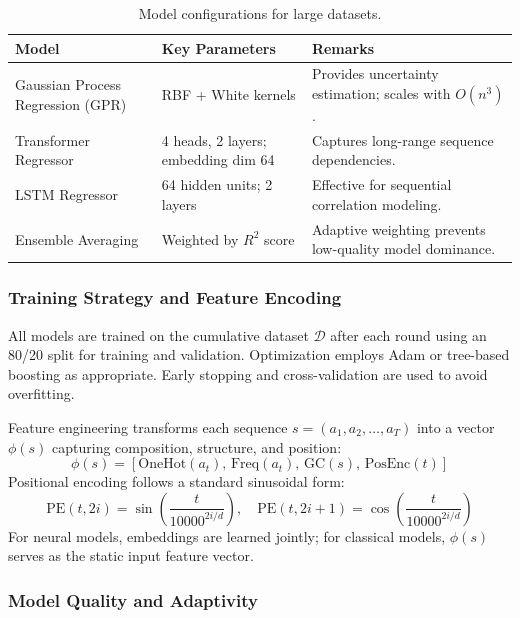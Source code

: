 \documentclass[conference]{IEEEtran}
\begin{document}
\begin{table}[!t]
\centering
\caption{Model configurations for large datasets.}
\label{tab:large_models}
\small %
\setlength{\tabcolsep}{3pt} %
\begin{tabularx}{\columnwidth}{@{} p{2.3cm} p{2.8cm} >{\RaggedRight}X @{}}
\toprule
\textbf{Model} & \textbf{Key Parameters} & \textbf{Remarks} \\
\midrule
Gaussian Process Regression (GPR) & RBF + White kernels & Provides uncertainty estimation; scales with $O(n^3)$. \\
Transformer Regressor & 4 heads, 2 layers; embedding dim 64 & Captures long-range sequence dependencies. \\
LSTM Regressor & 64 hidden units; 2 layers & Effective for sequential correlation modeling. \\
Ensemble Averaging & Weighted by $R^2$ score & Adaptive weighting prevents low-quality model dominance. \\
\bottomrule
\end{tabularx}
\end{table}

\subsubsection{Training Strategy and Feature Encoding}

All models are trained on the cumulative dataset $\mathcal{D}$ after each round using an 80/20 split for training and validation. Optimization employs Adam or tree-based boosting as appropriate. Early stopping and cross-validation are used to avoid overfitting.

Feature engineering transforms each sequence $s = (a_1, a_2, \ldots, a_T)$ into a vector $\phi(s)$ capturing composition, structure, and position:
\begin{equation}
\phi(s) = [\text{OneHot}(a_t),\, \text{Freq}(a_t),\, \text{GC}(s),\, \text{PosEnc}(t)]
\end{equation}
Positional encoding follows a standard sinusoidal form:
\begin{equation}
\text{PE}(t, 2i) = \sin\left(\frac{t}{10000^{2i/d}}\right), \quad 
\text{PE}(t, 2i+1) = \cos\left(\frac{t}{10000^{2i/d}}\right)
\end{equation}
For neural models, embeddings are learned jointly; for classical models, $\phi(s)$ serves as the static input feature vector.

\subsubsection{Model Quality and Adaptivity}
\end{document}
